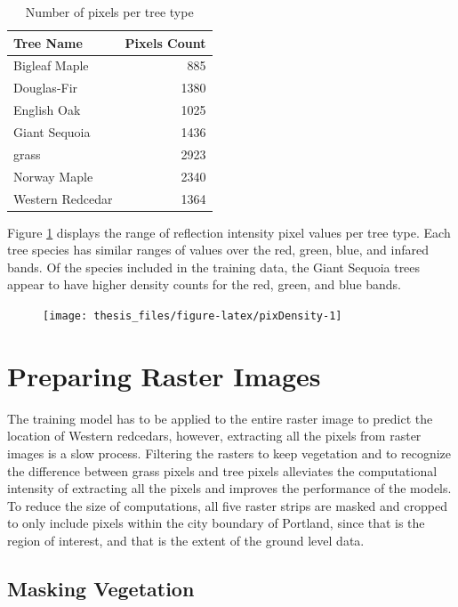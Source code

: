 \documentclass[12pt,twoside]{reedthesis}
\begin{document}
\begin{table}

\caption{\label{tab:pixelCounts}Number of pixels per tree type}
\centering
\begin{tabular}[t]{l|r}
\hline
Tree Name & Pixels Count\\
\hline
Bigleaf Maple & 885\\
\hline
Douglas-Fir & 1380\\
\hline
English Oak & 1025\\
\hline
Giant Sequoia & 1436\\
\hline
grass & 2923\\
\hline
Norway Maple & 2340\\
\hline
Western Redcedar & 1364\\
\hline
\end{tabular}
\end{table}
Figure \ref{fig:pixDensity} displays the range of reflection intensity pixel values per tree type. Each tree species has similar ranges of values over the red, green, blue, and infared bands. Of the species included in the training data, the Giant Sequoia trees appear to have higher density counts for the red, green, and blue bands.
\begin{figure}

{\centering \texttt{[image: thesis\_files/figure-latex/pixDensity-1]} 

}

\caption{ }\label{fig:pixDensity}
\end{figure}
\hypertarget{preparing-raster-images}{%
\section{Preparing Raster Images}\label{preparing-raster-images}}

The training model has to be applied to the entire raster image to predict the location of Western redcedars, however, extracting all the pixels from raster images is a slow process. Filtering the rasters to keep vegetation and to recognize the difference between grass pixels and tree pixels alleviates the computational intensity of extracting all the pixels and improves the performance of the models. To reduce the size of computations, all five raster strips are masked and cropped to only include pixels within the city boundary of Portland, since that is the region of interest, and that is the extent of the ground level data.

\hypertarget{masking-vegetation}{%
\subsection{Masking Vegetation}\label{masking-vegetation}}
\end{document}
